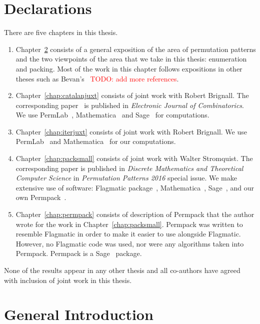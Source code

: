 \documentclass[12pt, a4paper, twoside]{report}
\begin{document}
\chapter{Declarations}
There are five chapters in this thesis.
\begin{enumerate}
\item Chapter~\ref{chap:general_intro} consists of a general exposition of the area of permutation patterns and the two viewpoints of the area that we take in this thesis: enumeration and packing. Most of the work in this chapter follows expositions in other theses such as Bevan's~\cite{bevan2015thesis} \textcolor{red}{TODO: add more references}. 
\item Chapter~\ref{chap:catalanjuxt} consists of joint work with Robert Brignall. The corresponding paper~\cite{brignallsliacanjuxt} is published in \emph{Electronic Journal of Combinatorics}. We use PermLab~\cite{albertpermlab}, Mathematica~\cite{mathematica} and Sage~\cite{sagemath} for computations.
\item Chapter~\ref{chap:iterjuxt} consists of joint work with Robert Brignall. We use PermLab~\cite{albertpermlab} and Mathematica~\cite{mathematica} for our computations.
\item Chapter~\ref{chap:packsmall} consists of joint work with Walter Stromquist. The corresponding paper is published in \emph{Discrete Mathematics and Theoretical Computer Science} in \emph{Permutation Patterns 2016} special issue. We make extensive use of software: Flagmatic package~\cite{flagmatic}, Mathematica~\cite{mathematica}, Sage~\cite{sagemath}, and our own Permpack~\cite{permpack}.
\item Chapter~\ref{chap:permpack} consists of description of Permpack that the author wrote for the work in Chapter~\ref{chap:packsmall}. Permpack was written to resemble Flagmatic in order to make it easier to use alongside Flagmatic. However, no Flagmatic code was used, nor were any algorithms taken into Permpack. Permpack is a Sage~\cite{sagemath} package.
\end{enumerate}
None of the results appear in any other thesis and all co-authors have agreed with inclusion of joint work in this thesis.



\setcounter{secnumdepth}{3}
\tableofcontents

\chapter{General Introduction}
\label{chap:general_intro}
\end{document}
